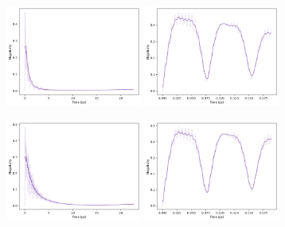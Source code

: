 \documentclass[11pt]{article}
\begin{document}
\begin{figure}[H]
    \centering
    \begin{subfigure}{\textwidth}
        \centering
        \includegraphics[width=0.49\textwidth]{Research Project/Code/results/ExVib/Open/Negativity/Envelope/neg_spont_e0.png}
        \hfill
        \includegraphics[width=0.49\textwidth]{Research Project/Code/results/ExVib/Open/Negativity/Fast/neg_spont_e0.png}
        \caption{}
        \label{fig:EVM_OQS_Neg_spont_e0}
    \end{subfigure}

    \vspace{0.8em}

    \begin{subfigure}{\textwidth}
        \centering
        \includegraphics[width=0.49\textwidth]{Research Project/Code/results/ExVib/Open/Negativity/Envelope/neg_therm_e0.png}
        \hfill
        \includegraphics[width=0.49\textwidth]{Research Project/Code/results/ExVib/Open/Negativity/Fast/neg_therm_e0.png}
        \caption{}
        \label{fig:EVM_OQS_Neg_therm_e0}
    \end{subfigure}


\end{figure}
\end{document}
